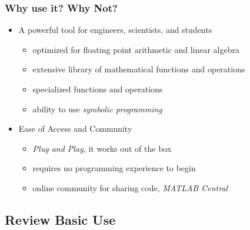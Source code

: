 \documentclass{ltx-talk} %
\newcommand{\sectionIIsubsectionIItitle}{Why use it? Why Not?}
\newcommand{\sectionIIsubsectionIIItitle}{Review Basic Use}
\begin{document}
			\begin{frame}
				\frametitle{\sectionIIsubsectionIItitle}

								\begin{itemize}
					\item A powerful tool for engineers, scientists, and students
					\begin{itemize}	
						\item  optimized for floating point arithmetic and linear algebra
						\item extensive library of mathematical functions and operations 
						\item specialized functions and operations
						\begin{itemize}
						\end{itemize}
						\item ability to use {\it symbolic programming }	
					\end{itemize}
					
					\item Ease of Access and Community
					\begin{itemize}
						\item {\it Plug and Play}, it works out of the box
						\item requires no programming experience to begin
						\item online community for sharing code,  {\it MATLAB Central}
					\end{itemize}
				\end{itemize}
				

				\btVFill 
			\end{frame}	

		\subsection{\sectionIIsubsectionIIItitle}\label{sectionIIsubsectionIII}
\end{document}
